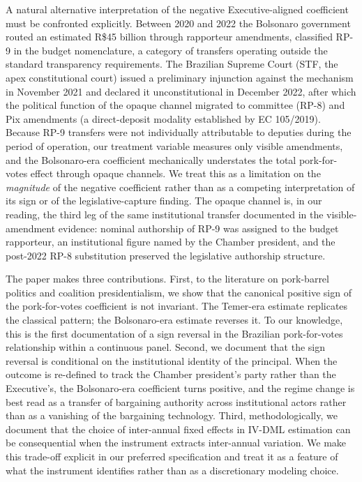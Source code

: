 \documentclass[preprint,12pt,authoryear]{elsarticle}
\begin{document}
A natural alternative interpretation of the negative Executive-aligned coefficient must be confronted explicitly. Between 2020 and 2022 the Bolsonaro government routed an estimated R\$45 billion through rapporteur amendments, classified RP-9 in the budget nomenclature, a category of transfers operating outside the standard transparency requirements. The Brazilian Supreme Court (STF, the apex constitutional court) issued a preliminary injunction against the mechanism in November 2021 and declared it unconstitutional in December 2022, after which the political function of the opaque channel migrated to committee (RP-8) and Pix amendments (a direct-deposit modality established by EC 105/2019). Because RP-9 transfers were not individually attributable to deputies during the period of operation, our treatment variable measures only visible amendments, and the Bolsonaro-era coefficient mechanically understates the total pork-for-votes effect through opaque channels. We treat this as a limitation on the \emph{magnitude} of the negative coefficient rather than as a competing interpretation of its sign or of the legislative-capture finding. The opaque channel is, in our reading, the third leg of the same institutional transfer documented in the visible-amendment evidence: nominal authorship of RP-9 was assigned to the budget rapporteur, an institutional figure named by the Chamber president, and the post-2022 RP-8 substitution preserved the legislative authorship structure.

The paper makes three contributions. First, to the literature on pork-barrel politics and coalition presidentialism, we show that the canonical positive sign of the pork-for-votes coefficient is not invariant. The Temer-era estimate replicates the classical \citet{PereiraAndMueller2004} pattern; the Bolsonaro-era estimate reverses it. To our knowledge, this is the first documentation of a sign reversal in the Brazilian pork-for-votes relationship within a continuous panel. Second, we document that the sign reversal is conditional on the institutional identity of the principal. When the outcome is re-defined to track the Chamber president's party rather than the Executive's, the Bolsonaro-era coefficient turns positive, and the regime change is best read as a transfer of bargaining authority across institutional actors rather than as a vanishing of the bargaining technology. Third, methodologically, we document that the choice of inter-annual fixed effects in IV-DML estimation can be consequential when the instrument extracts inter-annual variation. We make this trade-off explicit in our preferred specification and treat it as a feature of what the instrument identifies rather than as a discretionary modeling choice.
\end{document}

